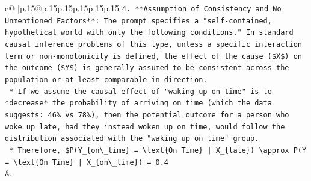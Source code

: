 \documentclass{article}
\begin{document}
{\begin{supertabular}{c@{$\;$}|p{.15\linewidth}@{}p{.15\linewidth}p{.15\linewidth}p{.15\linewidth}p{.15\linewidth}p{.15\linewidth}}
{{{\texttt{4.  **Assumption of Consistency and No Unmentioned Factors**: The prompt specifies a "self{-}contained, hypothetical world with only the following conditions." In standard causal inference problems of this type, unless a specific interaction term or non{-}monotonicity is defined, the effect of the cause (\$X\$) on the outcome (\$Y\$) is generally assumed to be consistent across the population or at least comparable in direction.} \\
\texttt{    *   If we assume the causal effect of "waking up on time" is to *decrease* the probability of arriving on time (which the data suggests: 46\% vs 78\%), then the potential outcome for a person who woke up late, had they instead woken up on time, would follow the distribution associated with the "waking up on time" group.} \\
\texttt{    *   Therefore, \$P(Y\_\{on\textbackslash{}\_time\} = \textbackslash{}text\{On Time\} | X\_\{late\}) \textbackslash{}approx P(Y = \textbackslash{}text\{On Time\} | X\_\{on\textbackslash{}\_time\}) = 0.4} \\
            }
        }
    }
    & \\ \\


\end{supertabular}}
\end{document}
